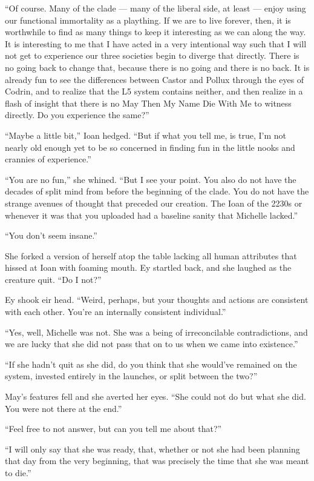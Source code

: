 ``Of course. Many of the clade — many of the liberal side, at least — enjoy using our functional immortality as a plaything. If we are to live forever, then, it is worthwhile to find as many things to keep it interesting as we can along the way. It is interesting to me that I have acted in a very intentional way such that I will not get to experience our three societies begin to diverge that directly. There is no going back to change that, because there is no going and there is no back. It is already fun to see the differences between Castor and Pollux through the eyes of Codrin, and to realize that the L5 system contains neither, and then realize in a flash of insight that there is no May Then My Name Die With Me to witness directly. Do you experience the same?''

``Maybe a little bit,'' Ioan hedged. ``But if what you tell me, is true, I'm not nearly old enough yet to be so concerned in finding fun in the little nooks and crannies of experience.''

``You are no fun,'' she whined. ``But I see your point. You also do not have the decades of split mind from before the beginning of the clade. You do not have the strange avenues of thought that preceded our creation. The Ioan of the 2230s or whenever it was that you uploaded had a baseline sanity that Michelle lacked.''

``You don't seem insane.''

She forked a version of herself atop the table lacking all human attributes that hissed at Ioan with foaming mouth. Ey startled back, and she laughed as the creature quit. ``Do I not?''

Ey shook eir head. ``Weird, perhaps, but your thoughts and actions are consistent with each other. You're an internally consistent individual.''

``Yes, well, Michelle was not. She was a being of irreconcilable contradictions, and we are lucky that she did not pass that on to us when we came into existence.''

``If she hadn't quit as she did, do you think that she would've remained on the system, invested entirely in the launches, or split between the two?''

May's features fell and she averted her eyes. ``She could not do but what she did. You were not there at the end.''

``Feel free to not answer, but can you tell me about that?''

``I will only say that she was ready, that, whether or not she had been planning that day from the very beginning, that was precisely the time that she was meant to die.''

